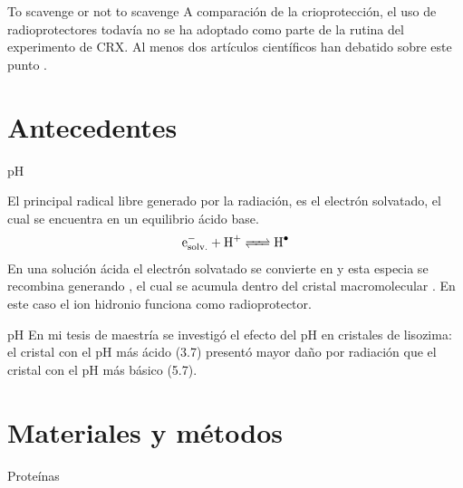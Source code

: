 \documentclass{beamer}
\begin{document}
\begin{frame}{To scavenge or not to scavenge}
A comparación de la crioprotección, el uso de radioprotectores todavía no se ha adoptado como parte de la rutina del experimento de CRX. Al menos dos artículos científicos han debatido sobre este punto \cite{Nowak2009,Allan2013}.    
\end{frame}


\section{Antecedentes}

\begin{frame}{pH}

El principal radical libre generado por la radiación, es el electrón solvatado, el cual se encuentra en un equilibrio ácido base.
\begin{equation*}
\ce{e^{-}_{solv.} + H^{+} <=> H^{.}}
\end{equation*}
En una solución ácida el electrón solvatado se convierte en  y esta especia se recombina generando , el cual se acumula dentro del cristal macromolecular \cite{Meents2010}. 
En este caso el ion hidronio funciona como radioprotector. 
\end{frame}

\begin{frame}{pH}
En mi tesis de maestría se investigó el efecto del pH en cristales de lisozima: el cristal con el pH más ácido (3.7) presentó mayor daño por radiación que el cristal con el pH más básico (5.7).
\end{frame}


\section{Materiales y métodos}

\begin{frame}{Proteínas}

\end{frame}
\end{document}
